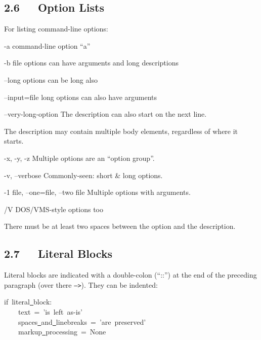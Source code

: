 \documentclass[10pt,english]{article}
\newcommand{\optionlistlabel}[1]{\bf #1 \hfill}
\newenvironment{optionlist}[1]
{\begin{list}{}
  {\setlength{\labelwidth}{#1}
   \setlength{\rightmargin}{1cm}
   \setlength{\leftmargin}{\rightmargin}
   \addtolength{\leftmargin}{\labelwidth}
   \addtolength{\leftmargin}{\labelsep}
   \renewcommand{\makelabel}{\optionlistlabel}}
}{\end{list}}
\begin{document}

\hypertarget{option-lists}{}
\subsection*{2.6~~~Option Lists}

For listing command-line options:
\begin{optionlist}{3cm}
\item [-a]  
command-line option ``a''
\item [-b file]  
options can have arguments
and long descriptions
\item [--long]  
options can be long also
\item [--input=file]  
long options can also have
arguments
\item [--very-long-option]  
The description can also start on the next line.

The description may contain multiple body elements,
regardless of where it starts.
\item [-x, -y, -z]  
Multiple options are an ``option group''.
\item [-v, --verbose]  
Commonly-seen: short {\&} long options.
\item [-1 file, --one=file, --two file]  
Multiple options with arguments.
\item [/V]  
DOS/VMS-style options too
\end{optionlist}

There must be at least two spaces between the option and the
description.



\hypertarget{literal-blocks}{}
\subsection*{2.7~~~Literal Blocks}

Literal blocks are indicated with a double-colon (``::'') at the end of
the preceding paragraph (over there \texttt{-->}).  They can be indented:
\begin{ttfamily}\begin{flushleft}
if~literal{\underline{~}}block:~\\
~~~~text~=~'is~left~as-is'~\\
~~~~spaces{\underline{~}}and{\underline{~}}linebreaks~=~'are~preserved'~\\
~~~~markup{\underline{~}}processing~=~None
\end{flushleft}\end{ttfamily}
\end{document}
